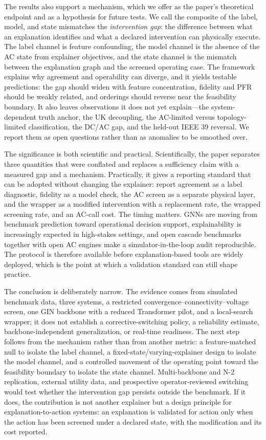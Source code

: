 The results also support a mechanism, which we offer as the paper's theoretical endpoint and as a hypothesis for future tests. We call the composite of the label, model, and state mismatches the \emph{intervention gap}: the difference between what an explanation identifies and what a declared intervention can physically execute. The label channel is feature confounding, the model channel is the absence of the AC state from explainer objectives, and the state channel is the mismatch between the explanation graph and the screened operating case. The framework explains why agreement and operability can diverge, and it yields testable predictions: the gap should widen with feature concentration, fidelity and PFR should be weakly related, and orderings should reverse near the feasibility boundary. It also leaves observations it does not yet explain---the system-dependent truth anchor, the UK decoupling, the AC-limited versus topology-limited classification, the DC/AC gap, and the held-out IEEE 39 reversal. We report them as open questions rather than as anomalies to be smoothed over.

The significance is both scientific and practical. Scientifically, the paper separates three quantities that were conflated and replaces a sufficiency claim with a measured gap and a mechanism. Practically, it gives a reporting standard that can be adopted without changing the explainer: report agreement as a label diagnostic, fidelity as a model check, the AC screen as a separate physical layer, and the wrapper as a modified intervention with a replacement rate, the wrapped screening rate, and an AC-call cost. The timing matters. GNNs are moving from benchmark prediction toward operational decision support, explainability is increasingly expected in high-stakes settings, and open cascade benchmarks together with open AC engines make a simulator-in-the-loop audit reproducible. The protocol is therefore available before explanation-based tools are widely deployed, which is the point at which a validation standard can still shape practice.

The conclusion is deliberately narrow. The evidence comes from simulated benchmark data, three systems, a restricted convergence--connectivity--voltage screen, one GIN backbone with a reduced Transformer pilot, and a local-search wrapper; it does not establish a corrective-switching policy, a reliability estimate, backbone-independent generalization, or real-time readiness. The next step follows from the mechanism rather than from another metric: a feature-matched null to isolate the label channel, a fixed-state/varying-explainer design to isolate the model channel, and a controlled movement of the operating point toward the feasibility boundary to isolate the state channel. Multi-backbone and N-2 replication, external utility data, and prospective operator-reviewed switching would test whether the intervention gap persists outside the benchmark. If it does, the contribution is not another explainer but a design principle for explanation-to-action systems: an explanation is validated for action only when the action has been screened under a declared state, with the modification and its cost reported.

